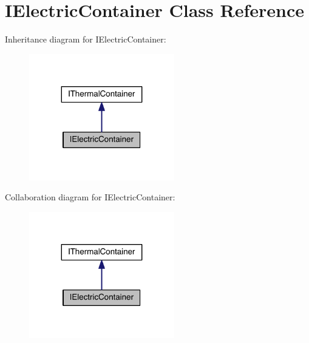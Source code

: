 \hypertarget{class_i_electric_container}{}\section{I\+Electric\+Container Class Reference}
\label{class_i_electric_container}


Inheritance diagram for I\+Electric\+Container\+:
\nopagebreak
\begin{figure}[H]
\begin{center}
\leavevmode
\includegraphics[width=179pt]{class_i_electric_container__inherit__graph}
\end{center}
\end{figure}


Collaboration diagram for I\+Electric\+Container\+:
\nopagebreak
\begin{figure}[H]
\begin{center}
\leavevmode
\includegraphics[width=179pt]{class_i_electric_container__coll__graph}
\end{center}
\end{figure}
